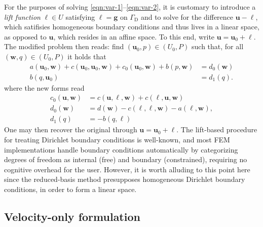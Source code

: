 \documentclass[onecolumn, twoside, a4paper, 11pt]{article}
\begin{document}
For the purposes of solving \eqref{eqn:var-1}--\eqref{eqn:var-2}, it is
customary to introduce a \emph{lift function} $\bm \ell \in U$ satisfying
$\bm{\ell} = \bm{g}$ on $\Gamma_\text{D}$ and to solve for the difference $\bm u - \bm
\ell$, which satifisies homogeneous boundary conditions and thus lives in a
linear space, as opposed to $\bm u$, which resides in an affine space. To this
end, write $\bm u = \bm u_0 + \bm \ell$. The modified problem then reads: find
$(\bm u_0, p) \in (U_0, P)$ such that, for all $(\bm w, q) \in (U_0, P)$ it
holds that
%
\begin{align}
a(\bm u_0, \bm w) + c(\bm u_0, \bm u_0, \bm w) + c_0(\bm u_0, \bm w) +
b(p, \bm w) &= d_0(\bm w)
\label{eqn:vvar-1}\\
  b(q, \bm u_0) &= d_1(q).
\label{eqn:vvar-2}
\end{align}
%
where the new forms read
%
\begin{align}
c_0(\bm u, \bm w)&=
c(\bm u, \bm{\ell}, \bm w)+c(\bm{\ell}, \bm u, \bm w)
\\
d_0(\bm w) &=d(\bm w)-c(\bm{\ell},\bm{\ell},  \bm w)-a(\bm{\ell}, \bm w),
\\
d_1(q)&=-b(q,\bm{\ell})
\end{align}
One may then recover the original through $\bm u = \bm u_0 + \bm \ell$. The lift-based procedure for
treating Dirichlet boundary conditions is well-known, and most FEM implementations handle
boundary conditions automatically by categorizing degrees of freedom as internal
(free) and boundary (constrained), requiring no cognitive overhead for the user.
However, it is worth alluding to this point here since the reduced-basis method
presupposes homogeneous Dirichlet boundary conditions, in order to form a linear space.

\subsection{Velocity-only formulation}
\end{document}
